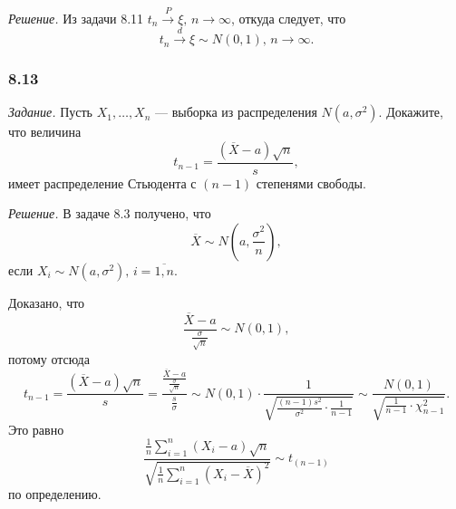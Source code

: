 \textit{Решение.}
Из задачи 8.11 $t_n \overset{P}{ \rightarrow } \xi, \, n \to \infty $, откуда следует,
что
$$t_n \overset{d}{ \rightarrow} \xi \sim N \left( 0, 1 \right), \,
  n \to \infty.$$

\subsubsection*{8.13}

\textit{Задание.}
Пусть $X_1, \dotsc, X_n$ --- выборка из распределения $N \left( a, \sigma^2 \right) $.
Докажите, что величина
$$t_{n - 1} =
  \frac{ \left( \overline{X} - a \right) \sqrt{n}}{s},$$
имеет распределение Стьюдента с $ \left( n - 1 \right) $ степенями свободы.

\textit{Решение.} В задаче 8.3 получено, что
$$ \overline{X} \sim
  N \left( a, \frac{ \sigma^2}{n} \right),$$
если $X_i \sim N \left( a, \sigma^2 \right), \, i = \overline{1, n}$.

Доказано, что
$$ \frac{ \overline{X} - a}{ \frac{ \sigma }{ \sqrt{n}}} \sim
  N \left( 0, 1 \right),$$
потому отсюда
$$t_{n - 1} =
  \frac{ \left( \overline{X} - a \right) \sqrt{n}}{s} =
  \frac{ \frac{ \overline{X} - a}{ \frac{ \sigma }{ \sqrt{n}}}}{ \frac{s}{ \sigma }} \sim
  N \left( 0, 1 \right) \cdot
  \frac{1}{ \sqrt{ \frac{ \left( n - 1 \right) s^2}{ \sigma^2} \cdot \frac{1}{n - 1}}} \sim
  \frac{N \left( 0, 1 \right) }{ \sqrt{ \frac{1}{n - 1} \cdot \chi_{n - 1}^2}}.$$
Это равно
$$ \frac{ \frac{1}{n} \sum \limits_{i = 1}^n \left( X_i - a \right) \sqrt{n}}{ \sqrt{ \frac{1}{n} \sum \limits_{i = 1}^n \left( X_i - \overline{X} \right)^2}} \sim
  t_{ \left( n - 1 \right) }$$
по определению.
